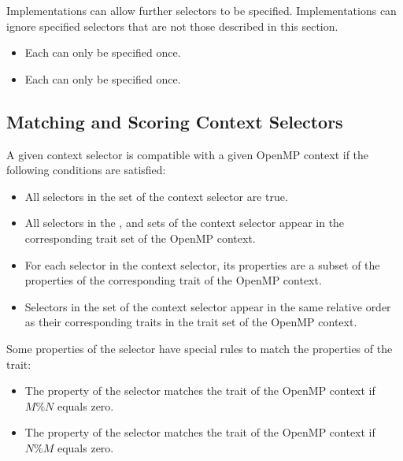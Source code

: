 Implementations can allow further selectors to be specified. Implementations can ignore specified selectors that are not those described in this section.

\restrictions
\begin{itemize}
 \item Each  can only be specified once.
 \item Each  can only be specified once.
\end{itemize}

\subsection{Matching and Scoring Context Selectors}
\label{subsec:Matching and Scoring Context Selectors}

A given context selector is compatible with a given OpenMP context if the
following conditions are satisfied:
\begin{itemize}
 \item All selectors in the  set of the context selector are true.
 \item All selectors in the ,  and  sets of the context selector appear in the corresponding trait set of the OpenMP context.
 \item For each selector in the context selector, its properties are a subset of the properties of the corresponding trait of the OpenMP context.
 \item Selectors in the  set of the context selector appear in the same relative order as their corresponding traits in the  trait set of the OpenMP context.
\end{itemize}

Some properties of the  selector have special rules to match the properties of the  trait:
\begin{itemize}
 \item The \code{)} property of the selector matches the
      trait of the OpenMP context if $M \% N$ equals zero.
 \item The \code{)} property of the selector matches the  trait of the OpenMP context if $N \% M$ equals zero.
\end{itemize}

